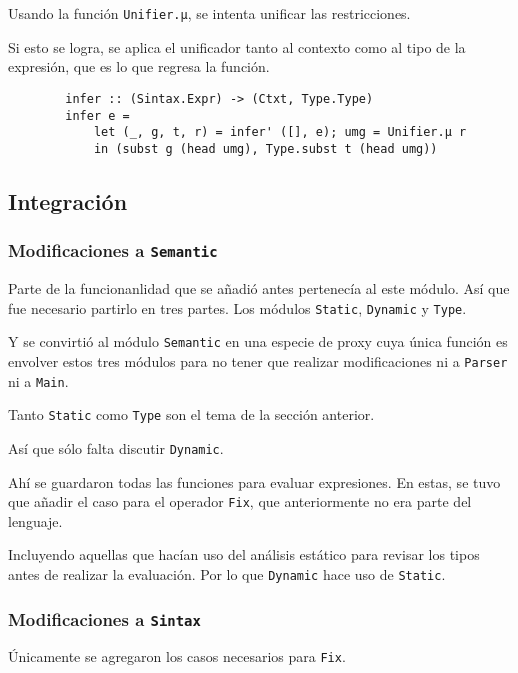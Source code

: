 \documentclass{article}
\begin{document}
    Usando la función \texttt{Unifier.µ}, se intenta unificar las restricciones.

    Si esto se logra, se aplica el unificador tanto al contexto como al tipo de
    la expresión, que es lo que regresa la función.

    \begin{verbatim}
        infer :: (Sintax.Expr) -> (Ctxt, Type.Type)
        infer e = 
            let (_, g, t, r) = infer' ([], e); umg = Unifier.µ r
            in (subst g (head umg), Type.subst t (head umg))
    \end{verbatim}


    \subsection{Integración}

    \subsubsection{Modificaciones a \texttt{Semantic}}

    Parte de la funcionanlidad que se añadió antes pertenecía al este módulo.
    Así que fue necesario partirlo en tres partes. Los módulos \texttt{Static},
    \texttt{Dynamic} y \texttt{Type}.

    Y se convirtió al módulo \texttt{Semantic} en una especie de proxy cuya
    única función es envolver estos tres módulos para no tener que realizar
    modificaciones ni a \texttt{Parser} ni a \texttt{Main}.

    Tanto \texttt{Static} como \texttt{Type} son el tema de la sección anterior.

    Así que sólo falta discutir \texttt{Dynamic}.

    Ahí se guardaron todas las funciones para evaluar expresiones. En estas, se
    tuvo que añadir el caso para el operador \texttt{Fix}, que anteriormente no
    era parte del lenguaje.

    Incluyendo aquellas que hacían uso del análisis estático para revisar los
    tipos antes de realizar la evaluación. Por lo que \texttt{Dynamic} hace uso
    de \texttt{Static}.

    \subsubsection{Modificaciones a \texttt{Sintax}}

    Únicamente se agregaron los casos necesarios para \texttt{Fix}.
\end{document}
